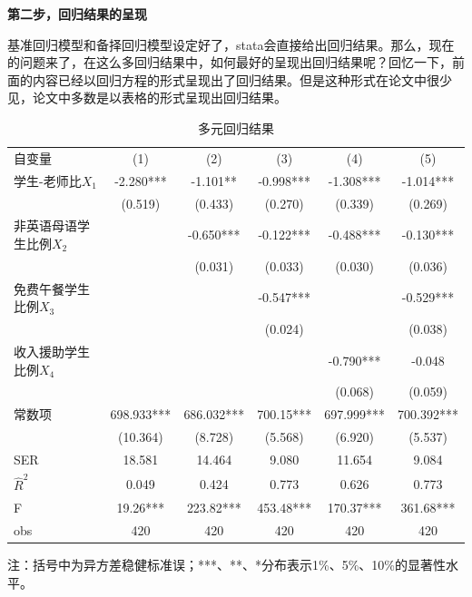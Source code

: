 \documentclass[cn,10pt,math=newtx,citestyle=gb7714-2015,bibstyle=gb7714-2015]{elegantbook}
\begin{document}
	\textbf{第二步，回归结果的呈现}
	
	基准回归模型和备择回归模型设定好了，stata会直接给出回归结果。那么，现在的问题来了，在这么多回归结果中，如何最好的呈现出回归结果呢？回忆一下，前面的内容已经以回归方程的形式呈现出了回归结果。但是这种形式在论文中很少见，论文中多数是以表格的形式呈现出回归结果。
	
	\begin{center}
		\begin{table}[!h]
			\caption{多元回归结果}\label{tab:digit}
			\begin{center}
				\begin{tabular}{lccccc}
					\hline
					自变量&(1)&(2)&(3)&(4)&(5)\\
					\cline{1-6}
					学生-老师比$X_1$&-2.280***&-1.101**&-0.998***&-1.308***&-1.014***\\
					&(0.519)&(0.433)&(0.270)&(0.339)&(0.269)\\
					
					非英语母语学生比例$X_2$&&-0.650***&-0.122***&-0.488***&-0.130***\\
					&&(0.031)&(0.033)&(0.030)&(0.036)\\
					
					免费午餐学生比例$X_3$&&&-0.547***&&-0.529***\\
					&&&(0.024)&&(0.038)\\
					
					收入援助学生比例$X_4$&&&&-0.790***&-0.048\\
					&&&&(0.068)&(0.059)\\
					
					常数项&698.933***&686.032***&700.15***&697.999***&700.392***\\
					&(10.364)&(8.728)&(5.568)&(6.920)&(5.537)\\
					\cline{1-6}
					SER&18.581&14.464&9.080&11.654&9.084\\
					
					$\hat{R}^2$&0.049&0.424&0.773&0.626&0.773\\
					
					F&19.26***&223.82***&453.48***&170.37***&361.68***\\
					
					obs&420&420&420&420&420\\
					\hline
				\end{tabular}
			\end{center}
		\end{table}
	\end{center}
	注：括号中为异方差稳健标准误；***、**、*分布表示1\%、5\%、10\%的显著性水平。
	
\end{document}
